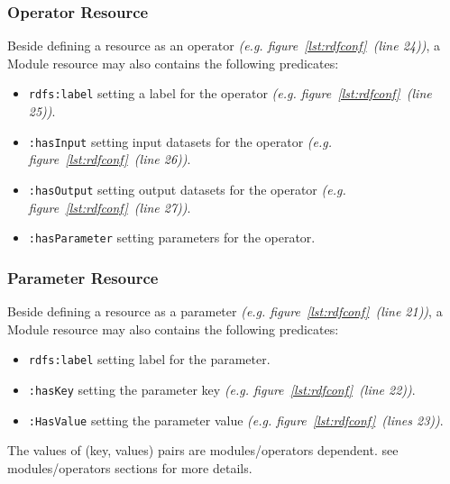 \documentclass[a4paper,twoside,bibtotoc,abstracton,12pt,BCOR=15mm]{article}
\begin{document}
\subsubsection{Operator Resource}
    Beside defining a resource as an operator \emph{(e.g. figure~\ref{lst:rdfconf}~(line 24))},
    a Module resource may also contains the following predicates:
    \begin{itemize}
	\item \texttt{rdfs:label} setting a label for the operator \emph{(e.g. figure~\ref{lst:rdfconf}~(line 25))}.
	\item \texttt{:hasInput} setting input datasets for the operator \emph{(e.g. figure~\ref{lst:rdfconf}~(line 26))}.
	\item \texttt{:hasOutput} setting output datasets for the operator \emph{(e.g. figure~\ref{lst:rdfconf}~(line 27))}.
	\item \texttt{:hasParameter} setting parameters for the operator.
    \end{itemize}

\subsubsection{Parameter Resource}
    Beside defining a resource as a parameter \emph{(e.g. figure~\ref{lst:rdfconf}~(line 21))},
    a Module resource may also contains the following predicates:
    \begin{itemize}
	\item \texttt{rdfs:label} setting label for the parameter.
	\item \texttt{:hasKey} setting the parameter key \emph{(e.g. figure~\ref{lst:rdfconf}~(line 22))}.
	\item \texttt{:HasValue} setting the parameter value \emph{(e.g. figure~\ref{lst:rdfconf}~(lines 23))}.
    \end{itemize}
    The values of (key, values) pairs are modules/operators dependent.
    see	modules/operators sections for more details.
\end{document}
